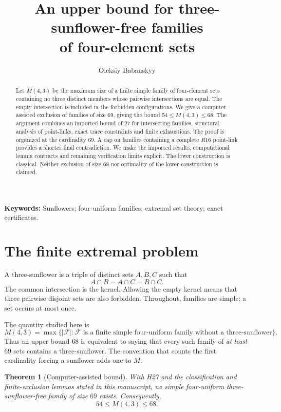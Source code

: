 \documentclass[11pt,a4paper]{article}
\title{\vspace{-12mm}\textbf{An upper bound for three-sunflower-free families\\of four-element sets}}
\author{Oleksiy Babanskyy}
\date{}
\numberwithin{equation}{section}
\newtheorem{theorem}{Theorem}[section]
\theoremstyle{remark}
\newcommand{\F}{\mathcal F}
\begin{document}
\maketitle

\begin{abstract}
Let $ M(4,3)$ be the maximum size of a finite simple family of four-element
sets containing no three distinct members whose pairwise intersections are
equal. The empty intersection is included in the forbidden configurations.
We give a computer-assisted exclusion of families of size $69$,
giving the bound $54\le M(4,3)\le 68$. The argument combines an
imported bound of $27$ for intersecting families, structural analysis of
point-links, exact trace constraints and finite exhaustions. The proof is
organized at the cardinality $69$. A cap on families containing a complete $ R16$ point-link
provides a shorter final contradiction. We make the imported results,
computational lemma contracts and remaining verification limits explicit.
The lower construction is classical. Neither exclusion of size $68$ nor
optimality of the lower construction is claimed.
\end{abstract}
\noindent\textbf{Keywords:} Sunflowers; four-uniform families; extremal set theory;
exact certificates.



\section{The finite extremal problem}
\label{sec:introduction}
A three-sunflower is a triple of distinct sets $ A,B,C $ such that
\[
 A\cap B=A\cap C=B\cap C.
\]
The common intersection is the kernel. Allowing the empty kernel means that
three pairwise disjoint sets are also forbidden. Throughout, families are
simple: a set occurs at most once.

The quantity studied here is
\[
 M(4,3)=\max\{\lvert\F\rvert:\F\text{ is a finite simple
 four-uniform family without a three-sunflower}\}.
\]
Thus an upper bound $68$ is equivalent to saying that every such family of
\emph{at least $69$} sets contains a three-sunflower. The convention that
counts the first cardinality forcing a sunflower adds one to $ M $.

\begin{theorem}[Computer-assisted bound]
\label{thm:main}
With H27 and the classification and finite-exclusion lemmas stated in this
manuscript, no simple four-uniform three-sunflower-free family of size $69$
exists. Consequently,
\[
 \boxed{54\le M(4,3)\le 68}.
\]
\end{theorem}
\end{document}
